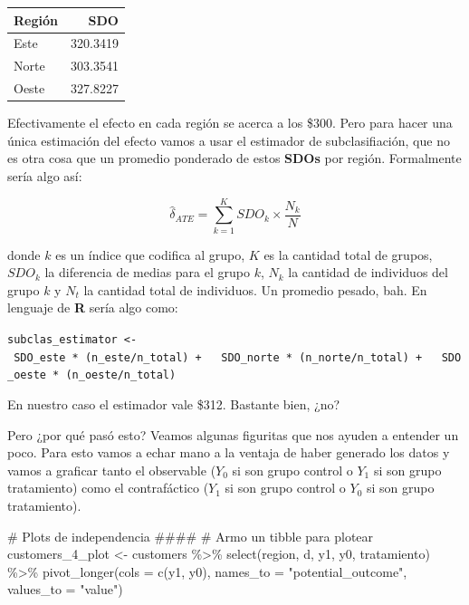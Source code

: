 \documentclass[
  letterpaper,
  DIV=11,
  numbers=noendperiod,
  oneside]{scrreprt}
\newenvironment{Shaded}{\begin{snugshade}}{\end{snugshade}}
\newcommand{\AttributeTok}[1]{\textcolor[rgb]{0.40,0.45,0.13}{#1}}
\newcommand{\CommentTok}[1]{\textcolor[rgb]{0.37,0.37,0.37}{#1}}
\newcommand{\FunctionTok}[1]{\textcolor[rgb]{0.28,0.35,0.67}{#1}}
\newcommand{\NormalTok}[1]{\textcolor[rgb]{0.00,0.23,0.31}{#1}}
\newcommand{\OtherTok}[1]{\textcolor[rgb]{0.00,0.23,0.31}{#1}}
\newcommand{\SpecialCharTok}[1]{\textcolor[rgb]{0.37,0.37,0.37}{#1}}
\newcommand{\StringTok}[1]{\textcolor[rgb]{0.13,0.47,0.30}{#1}}
\begin{document}
\begin{table}
\fontsize{12.0pt}{14.4pt}\selectfont
\begin{tabular*}{\linewidth}{@{\extracolsep{\fill}}lr}
\toprule
Región & SDO \\ 
\midrule\addlinespace[2.5pt]
Este & 320.3419 \\ 
Norte & 303.3541 \\ 
Oeste & 327.8227 \\ 
\bottomrule
\end{tabular*}
\end{table}

Efectivamente el efecto en cada región se acerca a los \$\(300\). Pero
para hacer una única estimación del efecto vamos a usar el estimador de
subclasifiación, que no es otra cosa que un promedio ponderado de estos
\textbf{SDOs} por región. Formalmente sería algo así:

\[
\hat\delta_{ATE} = \sum_{k=1}^K SDO_k \times \frac{N_k}{N}  
\]

donde \(k\) es un índice que codifica al grupo, \(K\) es la cantidad
total de grupos, \(SDO_k\) la diferencia de medias para el grupo \(k\),
\(N_k\) la cantidad de individuos del grupo \(k\) y \(N_t\) la cantidad
total de individuos. Un promedio pesado, bah. En lenguaje de \textbf{R}
sería algo como:

\texttt{subclas\_estimator\ \textless{}-\ SDO\_este\ *\ (n\_este/n\_total)\ +\ \ \ SDO\_norte\ *\ (n\_norte/n\_total)\ +\ \ \ SDO\_oeste\ *\ (n\_oeste/n\_total)}

En nuestro caso el estimador vale \$312. Bastante bien, ¿no?

Pero ¿por qué pasó esto? Veamos algunas figuritas que nos ayuden a
entender un poco. Para esto vamos a echar mano a la ventaja de haber
generado los datos y vamos a graficar tanto el observable (\(Y_0\) si
son grupo control o \(Y_1\) si son grupo tratamiento) como el
contrafáctico (\(Y_1\) si son grupo control o \(Y_0\) si son grupo
tratamiento).

\begin{Shaded}
\begin{Highlighting}[]
\CommentTok{\# Plots de independencia \#\#\#\#}
\CommentTok{\# Armo un tibble para plotear}
\NormalTok{customers\_4\_plot }\OtherTok{\textless{}{-}}\NormalTok{ customers }\SpecialCharTok{\%\textgreater{}\%} 
  \FunctionTok{select}\NormalTok{(region, d, y1, y0, tratamiento) }\SpecialCharTok{\%\textgreater{}\%} 
  \FunctionTok{pivot\_longer}\NormalTok{(}\AttributeTok{cols =} \FunctionTok{c}\NormalTok{(y1, y0),}
               \AttributeTok{names\_to =} \StringTok{"potential\_outcome"}\NormalTok{,}
               \AttributeTok{values\_to =} \StringTok{"value"}\NormalTok{)}
\end{Highlighting}
\end{Shaded}
\end{document}
